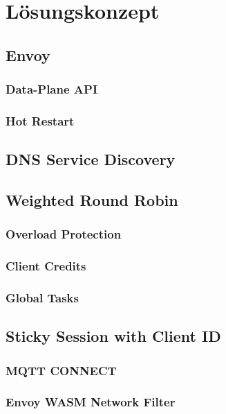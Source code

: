 \section{Lösungskonzept}

\subsection{Envoy}
\subsubsection{Data-Plane API}
\subsubsection{Hot Restart}

\subsection{DNS Service Discovery}

\subsection{Weighted Round Robin}
\subsubsection{Overload Protection}
\subsubsection{Client Credits}
\subsubsection{Global Tasks}

\subsection{Sticky Session with Client ID}
\subsubsection{MQTT CONNECT}
\subsubsection{Envoy WASM Network Filter}

